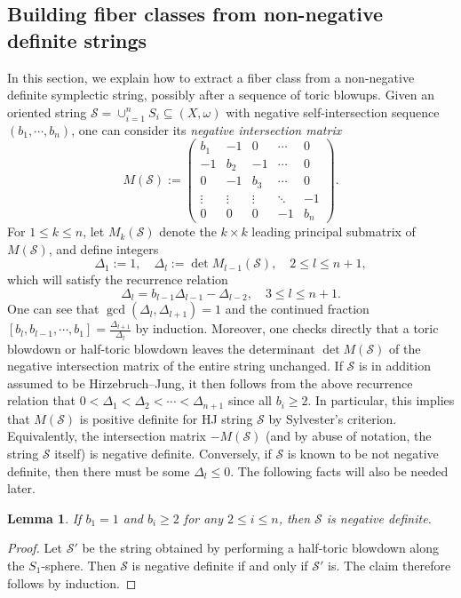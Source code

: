 \documentclass[11pt]{article}
\newtheorem{lemma}[theorem]{Lemma}
\theoremstyle{definition}
\theoremstyle{remark}
\newcommand{\st}{\mathcal{S}}
\begin{document}
\subsection{Building fiber classes from non-negative definite strings}\label{section:resfiberclass}
In this section, we explain how to extract a fiber class from a non-negative definite symplectic string, possibly after a sequence of toric blowups. Given an oriented string $\st=\cup_{i=1}^n S_i\subseteq (X,\omega)$ with negative self-intersection sequence $(b_1,\cdots,b_n)$, one can consider its \emph{negative intersection matrix} \[M(\st):=\begin{pmatrix}
b_1 & -1    & 0    & \cdots & 0 \\
-1    & b_2 & -1    & \cdots & 0 \\
0    & -1    & b_3 & \cdots & 0 \\
\vdots & \vdots & \vdots & \ddots & -1 \\
0    & 0    & 0    & -1      & b_n
\end{pmatrix}.\]
For $1 \le k \le n$, let $M_k(\st)$ denote the $k\times k$ leading principal submatrix of $M(\st)$, and define integers \[\Delta_1:=1,\quad \Delta_l:=\det M_{l-1}(\st), \quad 2\leq l\leq n+1,\] which will satisfy the recurrence relation \[\Delta_{l}=b_{l-1}\Delta_{l-1}-\Delta_{l-2},\quad 3\leq l\leq n+1.\]
One can see that $\gcd(\Delta_l,\Delta_{l+1})=1$ and the continued fraction $[b_l,b_{l-1},\cdots,b_1]=\frac{\Delta_{l+1}}{\Delta_l}$ by induction. Moreover, one checks directly that a toric blowdown or half-toric blowdown leaves the determinant $\det M(\st)$ of the negative intersection matrix of the entire string unchanged. If $\st$ is in addition assumed to be Hirzebruch--Jung, it then follows from the above recurrence relation that $0<\Delta_1<\Delta_2<\cdots<\Delta_{n+1}$ since all $b_i\geq 2$. In particular, this implies that $M(\st)$ is positive definite for HJ string $\st$ by Sylvester's criterion. Equivalently, the intersection matrix $-M(\st)$ (and by abuse of notation, the string $\st$ itself) is negative definite. Conversely, if $\st$ is known to be not negative definite, then there must be some $\Delta_l\leq 0$. The following facts will also be needed later.

\begin{lemma}\label{lem:-1endpoint}
  If $b_1=1$ and $b_i\geq 2$ for any $2\leq i\leq n$, then $\mathcal{S}$ is negative definite.
\end{lemma}

\begin{proof}
  Let $\mathcal{S}'$ be the string obtained by performing a half-toric blowdown along the $S_1$-sphere. Then $\mathcal{S}$ is negative definite if and only if $\mathcal{S}'$ is. The claim therefore follows by induction.
\end{proof}
\end{document}
